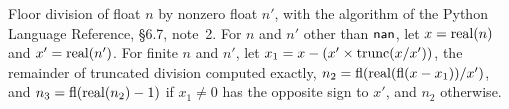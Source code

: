 Floor division of float $n$ by nonzero float $n'$, with the algorithm of the Python Language Reference, \S6.7, note~2. For $n$ and $n'$ other than $\mathsf{nan}$, let $x = \mathrm{real}(n)$ and $x' = \mathrm{real}(n')$. For finite $n$ and $n'$, let $x_1 = x - (x' \times \mathrm{trunc}(x / x'))$, the remainder of truncated division computed exactly, $n_2 = \mathrm{fl}(\mathrm{real}(\mathrm{fl}(x - x_1)) / x')$, and $n_3 = \mathrm{fl}(\mathrm{real}(n_2) - 1)$ if $x_1 \neq 0$ has the opposite sign to $x'$, and $n_2$ otherwise.
